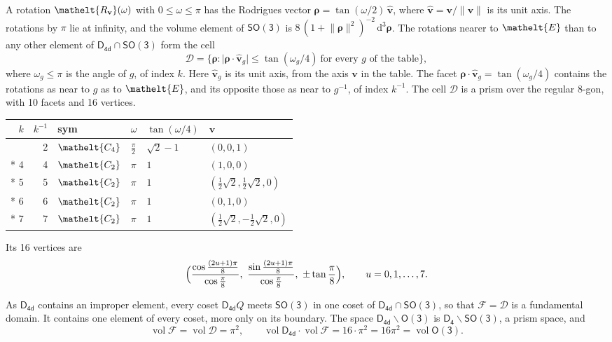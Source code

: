 \documentclass[10pt,a4paper]{article}
\numberwithin{equation}{section}
\newcommand{\eltfont}[1]{{\let\sigma\eltsigma\mathelt{#1}}}
\newcommand{\grp}[1]{\mathsf{#1}}
\newcommand{\cls}[1]{\eltfont{#1}}
\newcommand{\elt}[1]{\eltfont{#1}}
\newcommand{\dirvec}[3]{(#1, #2, #3)}
\newcommand{\unitaxis}{\hat{\mathbf{v}}}
\newcommand{\vv}{\mathbf{v}}
\newcommand{\diff}{\mathrm{d}}
\newcommand{\vol}{\operatorname{vol}}
\newcommand{\rodrigues}{\boldsymbol{\rho}}
\newcommand{\fcell}{\mathcal{D}}
\newcommand{\fdomain}{\mathcal{F}}
\begin{document}
\leavevmode\label{n:vector.rodrigues}\label{n:vector.unitaxis}A rotation $\elt{R_{\vv}}(\omega)$ with $0 \le \omega \le \pi$ has the Rodrigues vector $\rodrigues = \tan(\omega/2)\,\unitaxis$, where $\unitaxis = \vv/\lVert\vv\rVert$ is its unit axis. The rotations by $\pi$ lie at infinity, and the volume element of \href{SO3.pdf}{$\grp{SO(3)}$} is $8\,(1 + \lVert\rodrigues\rVert^2)^{-2}\,\diff^3\rodrigues$.
\leavevmode\label{n:set.cell}The rotations nearer to $\elt{E}$ than to any other element of $\grp{D_{4d}} \cap \grp{SO(3)}$ form the cell
\begin{equation}\label{e:cell}\fcell = \bigl\{\rodrigues : \lvert\rodrigues\cdot\unitaxis_g\rvert \le \tan(\omega_g/4)\ \text{for every $g$ of the table}\bigr\},\end{equation}
where $\omega_g \le \pi$ is the angle of $g$, of index $k$. Here $\unitaxis_g$ is its unit axis, from the axis $\vv$ in the table. The facet $\rodrigues\cdot\unitaxis_g = \tan(\omega_g/4)$ contains the rotations as near to $g$ as to $\elt{E}$, and its opposite those as near to $g^{-1}$, of index $k^{-1}$. The cell $\fcell$ is a prism over the regular 8-gon, with 10 facets and 16 vertices.
{\small{\renewcommand{\arraystretch}{1.3}\begin{longtable}{@{}rrllll@{}}\toprule
$k$ & $k^{-1}$ & sym & $\omega$ & $\tan(\omega/4)$ & $\vv$\\\midrule\endhead
\bottomrule\endfoot\endlastfoot
1 & 2 & $\cls{C_{4}}$ & $\tfrac{\pi}{2}$ & $\sqrt{2} - 1$ & $\dirvec{0}{0}{1}$\\*
4 & 4 & $\cls{C_{2}}$ & $\pi$ & $1$ & $\dirvec{1}{0}{0}$\\*
5 & 5 & $\cls{C_{2}}$ & $\pi$ & $1$ & $\dirvec{\tfrac{1}{2}\sqrt{2}}{\tfrac{1}{2}\sqrt{2}}{0}$\\*
6 & 6 & $\cls{C_{2}}$ & $\pi$ & $1$ & $\dirvec{0}{1}{0}$\\*
7 & 7 & $\cls{C_{2}}$ & $\pi$ & $1$ & $\dirvec{\tfrac{1}{2}\sqrt{2}}{-\tfrac{1}{2}\sqrt{2}}{0}$\\
\bottomrule\end{longtable}}}
\leavevmode\label{n:local.vertex.u}Its 16 vertices are
\begin{equation}\label{e:prism}\Bigl(\frac{\cos\frac{(2u+1)\pi}{8}}{\cos\frac{\pi}{8}},\ \frac{\sin\frac{(2u+1)\pi}{8}}{\cos\frac{\pi}{8}},\ \pm\tan\frac{\pi}{8}\Bigr),\qquad u = 0, 1, \dots, 7.\end{equation}

\leavevmode\label{n:set.fundamental}As $\grp{D_{4d}}$ contains an improper element, every coset $\grp{D_{4d}}Q$ meets \href{SO3.pdf}{$\grp{SO(3)}$} in one coset of $\grp{D_{4d}} \cap \grp{SO(3)}$, so that $\fdomain = \fcell$ is a fundamental domain. It contains one element of every coset, more only on its boundary.
The space $\grp{D_{4d}}\backslash\grp{O(3)}$ is $\grp{D_{4}}\backslash\grp{SO(3)}$, a prism space, and
\begin{equation}\label{e:volume}\vol\fdomain = \vol\fcell = \pi^2,\qquad \vol\grp{D_{4d}}\cdot\vol\fdomain = 16\cdot \pi^2 = 16\pi^2 = \vol\grp{O(3)}.\end{equation}
\end{document}
